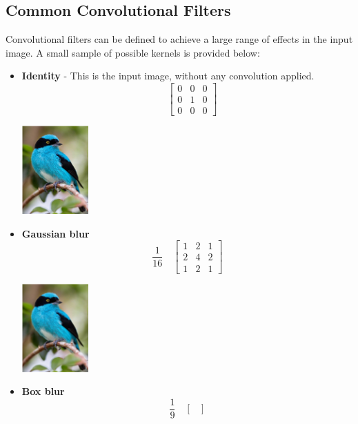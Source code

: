 \subsection{Common Convolutional Filters}
\label{sec:convolution:convolutionalfilters:commonconvolutionalfilters}
Convolutional filters can be defined to achieve a large range of effects in the input image.\newline
A small sample of possible kernels is provided below:\newline
\begin{itemize}
    \item \textbf{Identity} - This is the input image, without any convolution applied.
    $$
    \quad
    \begin{bmatrix} 
    0 & 0 & 0 \\
    0 & 1 & 0 \\
    0 & 0 & 0
    \end{bmatrix}
    $$
    \begin{center}
	\includegraphics[width=1in]{graphics/convolution/Convolution_gebs_KernelIdentity.png}
    \end{center}
    \item \textbf{Gaussian blur}
    $$
    \frac{1}{16}
    \quad
    \begin{bmatrix} 
    1 & 2 & 1 \\
    2 & 4 & 2 \\
    1 & 2 & 1
    \end{bmatrix}
    $$
    \begin{center}
	\includegraphics[width=1in]{graphics/convolution/Convolution_gebs_KernelGaussianBlur3x3.png}
    \end{center}
    \item \textbf{Box blur}
    $$
    \frac{1}{9}
    \quad
    \begin{bmatrix} 

\end{bmatrix}$$
\end{itemize}
